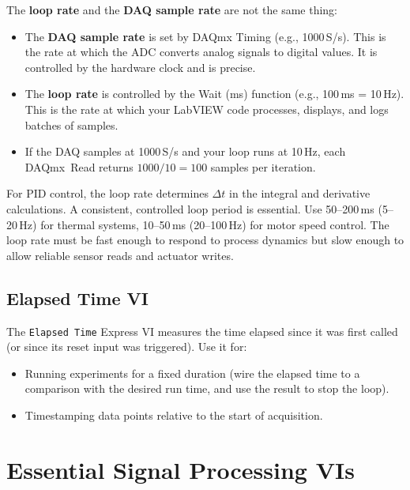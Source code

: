 The \textbf{loop rate} and the \textbf{DAQ sample rate} are not the same thing:

\begin{itemize}[leftmargin=1.5em]
\item The \textbf{DAQ sample rate} is set by DAQmx Timing (e.g., 1000\,S/s). This is the rate at which the ADC converts analog signals to digital values. It is controlled by the hardware clock and is precise.
\item The \textbf{loop rate} is controlled by the Wait (ms) function (e.g., 100\,ms = 10\,Hz). This is the rate at which your LabVIEW code processes, displays, and logs batches of samples.
\item If the DAQ samples at 1000\,S/s and your loop runs at 10\,Hz, each DAQmx~Read returns $1000/10 = 100$ samples per iteration.
\end{itemize}

\begin{tipbox}
For PID control, the loop rate determines $\Delta t$ in the integral and derivative calculations. A consistent, controlled loop period is essential. Use 50--200\,ms (5--20\,Hz) for thermal systems, 10--50\,ms (20--100\,Hz) for motor speed control. The loop rate must be fast enough to respond to process dynamics but slow enough to allow reliable sensor reads and actuator writes.
\end{tipbox}

\subsection{Elapsed Time VI}

The \texttt{Elapsed Time} Express VI measures the time elapsed since it was first called (or since its reset input was triggered). Use it for:

\begin{itemize}[nosep,leftmargin=1.5em]
\item Running experiments for a fixed duration (wire the elapsed time to a comparison with the desired run time, and use the result to stop the loop).
\item Timestamping data points relative to the start of acquisition.
\end{itemize}

\section{Essential Signal Processing VIs}
\label{sec:lv_signal_proc}


